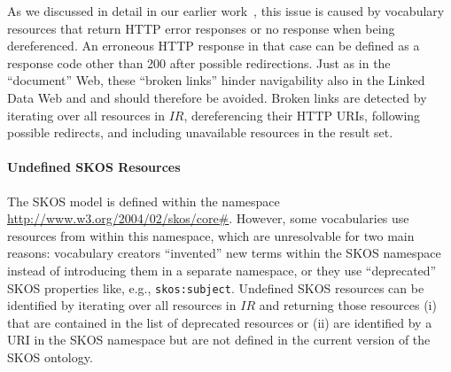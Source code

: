 As we discussed in detail in our earlier work~\cite{Popitsch:2010:DHB:1772690.1772768}, this issue is caused by vocabulary resources that return HTTP error responses or no response when being dereferenced. An erroneous HTTP response in that case can be defined as a response code other than 200 after possible redirections. Just as in the ``document'' Web, these ``broken links'' hinder navigability also in the Linked Data Web and and should therefore be avoided. 
Broken links are detected by iterating over all resources in $IR$, dereferencing their HTTP URIs, following possible redirects, and including unavailable resources in the result set.

\paragraph{Undefined SKOS Resources}

The SKOS model is defined within the namespace \url{http://www.w3.org/2004/02/skos/core#}. However, some vocabularies use resources from within this namespace, which are unresolvable for two main reasons: vocabulary creators ``invented'' new terms within the SKOS namespace instead of introducing them in a separate namespace, or they use ``deprecated'' SKOS properties like, e.g., \texttt{skos:subject}.
Undefined SKOS resources can be identified by iterating over all resources in $IR$ and returning those resources (i) that are contained in the list of deprecated resources or (ii) are identified by a URI in the SKOS namespace but are not defined in the current version of the SKOS ontology.
